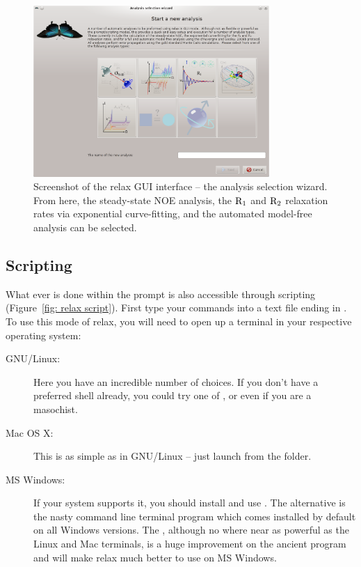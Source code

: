\begin{figure}
\centerline{\includegraphics[width=0.8\textwidth, bb=14 14 768 560]{graphics/screenshots/analysis_wizard}}
\caption[GUI screenshot -- Analysis wizard screenshot]{Screenshot of the relax GUI interface -- the analysis selection wizard.  From here, the steady-state NOE analysis, the $\mathrm{R}_1$ and $\mathrm{R}_2$ relaxation rates via exponential curve-fitting, and the automated model-free analysis can be selected.}\label{fig: screenshot: analysis wizard}
\end{figure}




\subsection{Scripting} \label{sect: scripting}

What ever is done within the prompt is also accessible through scripting (Figure~\ref{fig: relax script}).  First type your commands into a text file ending in .  To use this mode of relax, you will need to open up a terminal in your respective operating system:

\begin{description}
\item[GNU/Linux:]  Here you have an incredible number of choices.  If you don't have a preferred shell already, you could try one of ,  or even  if you are a masochist.
\item[Mac OS X:]  This is as simple as in GNU/Linux -- just launch  from the  folder.
\item[MS Windows:]  If your system supports it, you should install and use .  The alternative is the nasty  command line terminal program which comes installed by default on all Windows versions.  The , although no where near as powerful as the Linux and Mac terminals, is a huge improvement on the ancient  program and will make relax much better to use on MS Windows.
\end{description}

